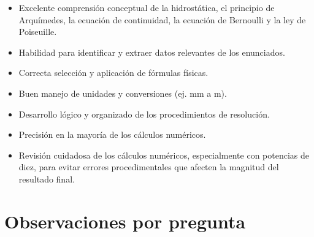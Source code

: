 \documentclass[11pt,a4paper]{article}
\begin{document}
\vspace{4pt}
\begin{minipage}[t]{0.48\linewidth}
  \begin{tcolorbox}[cajaFortaleza, title={Fortalezas}]
\begin{itemize}[leftmargin=1.5em, itemsep=2pt]
  \item Excelente comprensión conceptual de la hidrostática, el principio de Arquímedes, la ecuación de continuidad, la ecuación de Bernoulli y la ley de Poiseuille.
  \item Habilidad para identificar y extraer datos relevantes de los enunciados.
  \item Correcta selección y aplicación de fórmulas físicas.
  \item Buen manejo de unidades y conversiones (ej. mm a m).
  \item Desarrollo lógico y organizado de los procedimientos de resolución.
  \item Precisión en la mayoría de los cálculos numéricos.
\end{itemize}
  \end{tcolorbox}
\end{minipage}
\hfill
\begin{minipage}[t]{0.48\linewidth}
  \begin{tcolorbox}[cajaMejora, title={Areas de mejora}]
\begin{itemize}[leftmargin=1.5em, itemsep=2pt]
  \item Revisión cuidadosa de los cálculos numéricos, especialmente con potencias de diez, para evitar errores procedimentales que afecten la magnitud del resultado final.
\end{itemize}
  \end{tcolorbox}
\end{minipage}

\section*{Observaciones por pregunta}
\end{document}
